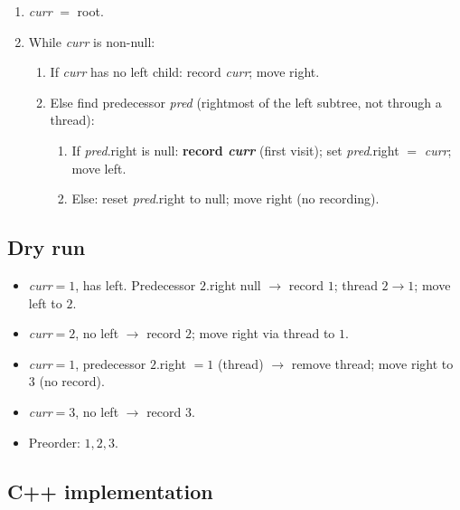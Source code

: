 \begin{enumerate}
  \item \textit{curr} $=$ root.
  \item While \textit{curr} is non-null:
  \begin{enumerate}
    \item If \textit{curr} has no left child: record \textit{curr}; move
          right.
    \item Else find predecessor \textit{pred} (rightmost of the left
          subtree, not through a thread):
    \begin{enumerate}
      \item If \textit{pred}.right is null: \textbf{record
            \textit{curr}} (first visit); set \textit{pred}.right $=$
            \textit{curr}; move left.
      \item Else: reset \textit{pred}.right to null; move right (no
            recording).
    \end{enumerate}
  \end{enumerate}
\end{enumerate}

\subsection*{Dry run}


\begin{itemize}
  \item \textit{curr}$=1$, has left. Predecessor $2$.right null $\to$
        record $1$; thread $2\!\to\!1$; move left to $2$.
  \item \textit{curr}$=2$, no left $\to$ record $2$; move right via
        thread to $1$.
  \item \textit{curr}$=1$, predecessor $2$.right $=1$ (thread) $\to$
        remove thread; move right to $3$ (no record).
  \item \textit{curr}$=3$, no left $\to$ record $3$.
  \item Preorder: $1,2,3$.
\end{itemize}

\subsection*{C++ implementation}

